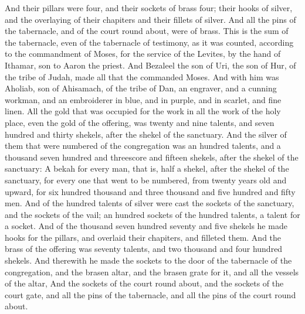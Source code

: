 \begin{biblechapter}
\verse And their pillars were four, and their sockets of brass four; their hooks of silver, and the overlaying of their chapiters and their fillets of silver.
\verse And all the pins of the tabernacle, and of the court round about, were of brass.
 This is the sum of the tabernacle, even of the tabernacle of testimony, as it was counted, according to the commandment of Moses, for the service of the Levites, by the hand of Ithamar, son to Aaron the priest.
\verse And Bezaleel the son of Uri, the son of Hur, of the tribe of Judah, made all that the \LORD commanded Moses.
\verse And with him was Aholiab, son of Ahisamach, of the tribe of Dan, an engraver, and a cunning workman, and an embroiderer in blue, and in purple, and in scarlet, and fine linen.
\verse All the gold that was occupied for the work in all the work of the holy place, even the gold of the offering, was twenty and nine talents, and seven hundred and thirty shekels, after the shekel of the sanctuary.
\verse And the silver of them that were numbered of the congregation was an hundred talents, and a thousand seven hundred and threescore and fifteen shekels, after the shekel of the sanctuary:
\verse A bekah for every man, that is, half a shekel, after the shekel of the sanctuary, for every one that went to be numbered, from twenty years old and upward, for six hundred thousand and three thousand and five hundred and fifty men.
\verse And of the hundred talents of silver were cast the sockets of the sanctuary, and the sockets of the vail; an hundred sockets of the hundred talents, a talent for a socket.
\verse And of the thousand seven hundred seventy and five shekels he made hooks for the pillars, and overlaid their chapiters, and filleted them.
\verse And the brass of the offering was seventy talents, and two thousand and four hundred shekels.
\verse And therewith he made the sockets to the door of the tabernacle of the congregation, and the brasen altar, and the brasen grate for it, and all the vessels of the altar,
\verse And the sockets of the court round about, and the sockets of the court gate, and all the pins of the tabernacle, and all the pins of the court round about.
\end{biblechapter}

